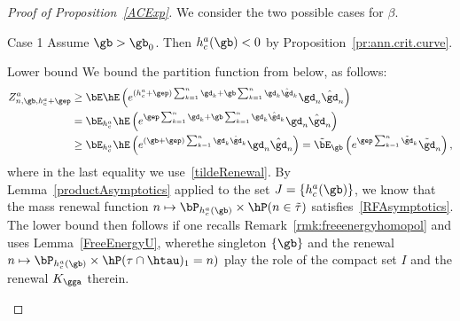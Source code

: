 \begin{proof}[Proof of Proposition~\ref{ACExp}]
We consider the two possible cases for $\beta$.

\begin{step}{Case 1}
Assume $\gb > \gb_0$. Then $h_c^a(\gb) < 0$ by Proposition~\ref{pr:ann.crit.curve}.

\begin{step}{Lower bound} We bound the partition function from below, as follows:
\begin{equation}
\begin{aligned}
Z^a_{n,\gb,h_c^a + \gep} &\geq \bE \hE \left(e^{(h_c^a + \gep) \sum_{k=1}^n \gd_k + \gb \sum_{k=1}^n \gd_k \hat \gd_k} \gd_n \hat \gd_n \right)\\
&= \bE_{h_c^a} \hE \left(e^{\gep \sum_{k=1}^n \gd_k + \gb \sum_{k=1}^n \gd_k \hat \gd_k} \gd_n \hat \gd_n \right)\\
&\geq \bE_{h_c^a} \hE \left(e^{(\gb + \gep) \sum_{k=1}^n \gd_k \hat \gd_k} \gd_n \hat \gd_n \right) = \tilde \bE_\gb \left(e^{\gep \sum_{k=1}^n \tilde \gd_k} \tilde \gd_n \right),
\end{aligned}
\end{equation}
where in the last equality we use~\eqref{tildeRenewal}. By Lemma~\ref{productAsymptotics} applied to the set $J = \{h_c^a(\gb)\}$, we know that the mass renewal function $n \mapsto \bP_{h_c^a(\gb)} \times \hP(n \in \tilde\tau)$ satisfies~\eqref{RFAsymptotics}. The lower bound then follows if one recalls Remark~\ref{rmk:freeenergyhomopol} and uses Lemma~\ref{FreeEnergyU}, where\linebreak the singleton $\{\gb\}$ and the renewal $n \mapsto \bP_{h_c^a(\gb)} \times \hP(\tau \cap \htau)_1 = n)$ play the role of the com\-pact set $I$ and the renewal $K_\gga$ therein.
\end{step}


\end{step}
\end{proof}
